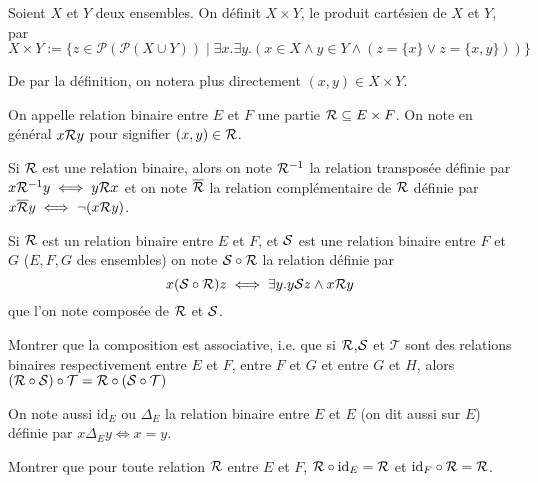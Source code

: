 \begin{defi}
    Soient $X$ et $Y$ deux ensembles. On définit $X\times Y$, le produit cartésien de $X$ et $Y$, par $$X\times Y := \{ z\in \mathcal P(\mathcal P(X\cup Y)) \mid \exists x.\exists y. (x\in X\land y\in Y \land (z = \{x\} \lor z = \{x,y\}))\}$$

    De par la définition, on notera plus directement $(x,y)\in X\times Y$.
\end{defi}

\begin{defi}
    On appelle relation binaire entre $E$ et $F$ une partie $\mathcal R\subseteq E\times F$. On note en général $x\mathcal R y$ pour signifier $(x,y)\in\mathcal R$.
\end{defi}

\begin{defi}
    Si $\mathcal R$ est une relation binaire, alors on note $\mathcal R^{-1}$ la relation transposée définie par $x\mathcal R^{-1} y \iff y\mathcal R x$ et on note $\overline {\mathcal R}$ la relation complémentaire de $\mathcal R$ définie par $x\overline {\mathcal R} y \iff \lnot (x\mathcal R y)$.

    Si $\mathcal R$ est un relation binaire entre $E$ et $F$, et $\mathcal S$ est une relation binaire entre $F$ et $G$ ($E,F,G$ des ensembles) on note $\mathcal S\circ\mathcal R$ la relation définie par $$x(\mathcal S\circ\mathcal R) z \iff \exists y. y\mathcal S z\land x\mathcal R y$$ que l'on note composée de $\mathcal R$ et $\mathcal S$.
\end{defi}

\begin{exo}
    Montrer que la composition est associative, i.e. que si $\mathcal R$,$\mathcal S$ et $\mathcal T$ sont des relations binaires respectivement entre $E$ et $F$, entre $F$ et $G$ et entre $G$ et $H$, alors $(\mathcal R\circ \mathcal S)\circ\mathcal T = \mathcal R\circ(\mathcal S\circ\mathcal T)$
\end{exo}

\begin{defi}
    On note aussi $\mathrm{id}_E$ ou $\Delta_E$ la relation binaire entre $E$ et $E$ (on dit aussi \og sur $E$\fg{}) définie par $x\Delta_E y \iff x = y$.
\end{defi}

\begin{exo}
    Montrer que pour toute relation $\mathcal R$ entre $E$ et $F$, $\mathcal R\circ \mathrm{id}_E = \mathcal R$ et $\mathrm{id}_F\circ\mathcal R = \mathcal R$.
\end{exo}

